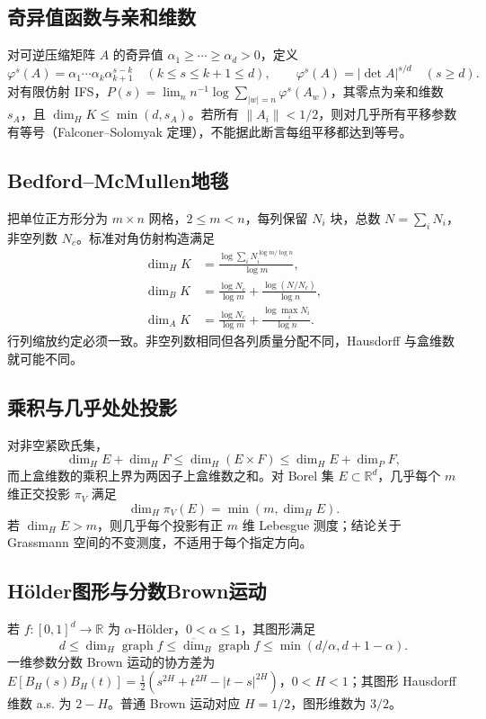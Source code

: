 \documentclass[../main.tex]{subfiles}
\begin{document}
\subsection{奇异值函数与亲和维数}
对可逆压缩矩阵 $A$ 的奇异值 $\alpha_1\ge\cdots\ge\alpha_d>0$，定义
\[
\varphi^s(A)=\alpha_1\cdots\alpha_k\alpha_{k+1}^{s-k}\quad(k\le s\le k+1\le d),
\qquad\varphi^s(A)=|\det A|^{s/d}\quad(s\ge d).
\]
对有限仿射 IFS，$P(s)=\lim_n n^{-1}\log\sum_{|w|=n}\varphi^s(A_w)$，其零点为亲和维数 $s_A$，且 $\dim_HK\le\min(d,s_A)$。若所有 $\|A_i\|<1/2$，则对几乎所有平移参数有等号（Falconer--Solomyak 定理），不能据此断言每组平移都达到等号。
\subsection{Bedford--McMullen地毯}
把单位正方形分为 $m\times n$ 网格，$2\le m<n$，每列保留 $N_i$ 块，总数 $N=\sum_iN_i$，非空列数 $N_c$。标准对角仿射构造满足
\begin{align*}
\dim_HK&=\frac{\log\sum_iN_i^{\log m/\log n}}{\log m},\\
\dim_BK&=\frac{\log N_c}{\log m}+\frac{\log(N/N_c)}{\log n},\\
\dim_AK&=\frac{\log N_c}{\log m}+\frac{\log\max_iN_i}{\log n}.
\end{align*}
行列缩放约定必须一致。非空列数相同但各列质量分配不同，Hausdorff 与盒维数就可能不同。
\subsection{乘积与几乎处处投影}
对非空紧欧氏集，
\[
\dim_HE+\dim_HF\le\dim_H(E\times F)\le\dim_HE+\dim_PF,
\]
而上盒维数的乘积上界为两因子上盒维数之和。对 Borel 集 $E\subset\mathbb R^d$，几乎每个 $m$ 维正交投影 $\pi_V$ 满足
\[
\dim_H\pi_V(E)=\min(m,\dim_HE).
\]
若 $\dim_HE>m$，则几乎每个投影有正 $m$ 维 Lebesgue 测度；结论关于 Grassmann 空间的不变测度，不适用于每个指定方向。
\subsection{Hölder图形与分数Brown运动}
若 $f:[0,1]^d\to\mathbb R$ 为 $\alpha$-Hölder，$0<\alpha\le1$，其图形满足
\[
d\le\dim_H\operatorname{graph}f\le\overline{\dim}_B\operatorname{graph}f
\le\min(d/\alpha,d+1-\alpha).
\]
一维参数分数 Brown 运动的协方差为 $E[B_H(s)B_H(t)]=\frac12(s^{2H}+t^{2H}-|t-s|^{2H})$，$0<H<1$；其图形 Hausdorff 维数 a.s. 为 $2-H$。普通 Brown 运动对应 $H=1/2$，图形维数为 $3/2$。
\end{document}
